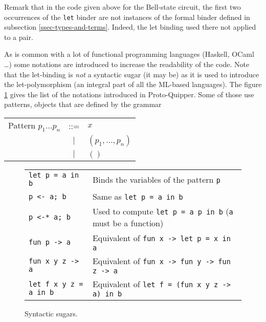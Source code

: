 Remark that in the code given above for the Bell-state circuit, 
the first two occurrences of the \verb#let# binder are not 
instances of the formal binder defined in subsection 
\hyperref[ssec-types-and-terms]{\ref*{ssec-types-and-terms}}. 
Indeed, the let binding used there not applied to a pair. 


As is common with a lot of functional programming languages 
(Haskell, OCaml \ldots) some notations are introduced to increase
the readability of the code. Note that the let-binding is \emph{not} a syntactic sugar (it may be) as it is used to introduce
the let-polymorphism (an integral part of all the ML-based languages).
The figure \ref{sugar} gives the list of the notations introduced in Proto-Quipper. Some of those use patterns, objects that are
defined by the grammar
	\begin{center}
	\begin{tabular}{rcl}
		Pattern $p_1 \dots p_n$ & ::= & $x$ \\
		            & $|$ & $(p_1, \dots, p_n)$ \\
		            & $|$ & $()$
	\end{tabular}
	\end{center}

\begin{figure}[!ht]
\begin{tabular}{ll}
  \verb#let p = a in b#       & Binds the variables of the pattern 
                                \verb#p# \\
  \verb#p <- a; b#            & Same as \verb#let p = a in b# \\
  \verb#p <-* a; b#           & Used to compute \verb#let p = a p in b#
                                (\verb#a# must be a function)\\
  \verb#fun p -> a#           & Equivalent of 
                                \verb#fun x -> let p = x in a# \\
  \verb#fun x y z -> a#       & Equivalent of 
                                \verb#fun x -> fun y -> fun z -> a# \\
  \verb#let f x y z = a in b# & Equivalent of 
                                \verb#let f = (fun x y z -> a) in b#
\end{tabular}
\label{sugar}
\caption{Syntactic sugars.}
\end{figure}

